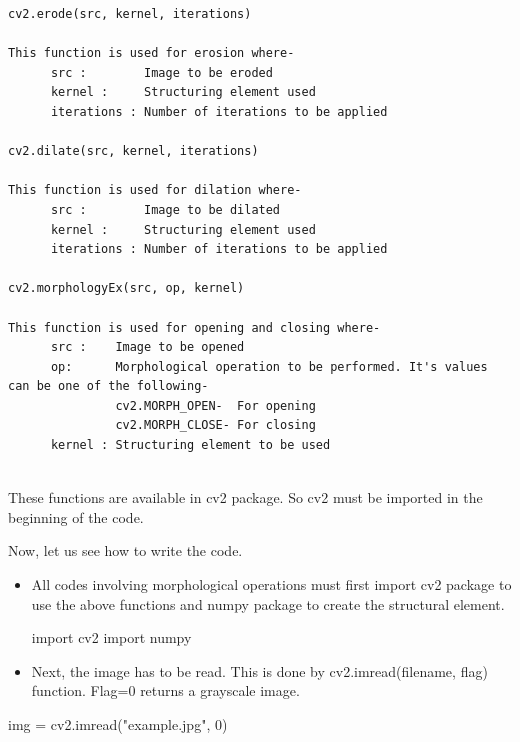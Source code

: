 \documentclass[]{article}
\newenvironment{Shaded}{}{}
\newcommand{\DecValTok}[1]{\textcolor[rgb]{0.25,0.63,0.44}{{#1}}}
\newcommand{\StringTok}[1]{\textcolor[rgb]{0.25,0.44,0.63}{{#1}}}
\newcommand{\ImportTok}[1]{{#1}}
\newcommand{\OperatorTok}[1]{\textcolor[rgb]{0.40,0.40,0.40}{{#1}}}
\newcommand{\NormalTok}[1]{{#1}}
\begin{document}
\begin{verbatim}
cv2.erode(src, kernel, iterations)

This function is used for erosion where-
      src :        Image to be eroded
      kernel :     Structuring element used
      iterations : Number of iterations to be applied

cv2.dilate(src, kernel, iterations)

This function is used for dilation where-
      src :        Image to be dilated
      kernel :     Structuring element used
      iterations : Number of iterations to be applied

cv2.morphologyEx(src, op, kernel)

This function is used for opening and closing where-
      src :    Image to be opened
      op:      Morphological operation to be performed. It's values can be one of the following-
               cv2.MORPH_OPEN-  For opening
               cv2.MORPH_CLOSE- For closing
      kernel : Structuring element to be used
      
\end{verbatim}

These functions are available in cv2 package. So cv2 must be imported in
the beginning of the code.

Now, let us see how to write the code.

\begin{itemize}
\item
  All codes involving morphological operations must first import cv2
  package to use the above functions and numpy package to create the
  structural element.

\begin{Shaded}
\begin{Highlighting}[]
\ImportTok{import} \NormalTok{cv2}
\ImportTok{import} \NormalTok{numpy}
\end{Highlighting}
\end{Shaded}
\item
  Next, the image has to be read. This is done by cv2.imread(filename,
  flag) function. Flag=0 returns a grayscale image.
\end{itemize}

\begin{Shaded}
\begin{Highlighting}[]
    \NormalTok{img }\OperatorTok{=} \NormalTok{cv2.imread(}\StringTok{"example.jpg"}\NormalTok{, }\DecValTok{0}\NormalTok{)}
\end{Highlighting}
\end{Shaded}
\end{document}
